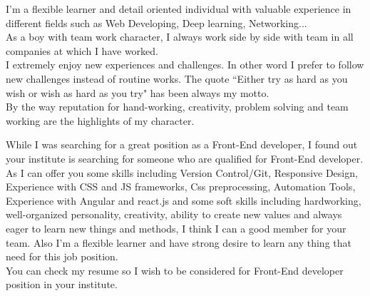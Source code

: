 \documentclass[11pt, a4paper]{awesome-cv}
\begin{document}
\makecvheader

\makelettertitle

\begin{cvletter}
I'm a flexible learner and detail oriented individual with valuable experience in different fields such as Web Developing, Deep learning, Networking...\\
As a boy with team work character, I always work side by side with team in all companies at which I have worked.\\
I extremely enjoy new experiences and challenges. In other word I prefer to follow new challenges instead of routine works. The quote ``Either try as hard as you wish or wish as hard as you try" has been always my motto.\\
By the way reputation for hand-working, creativity, problem solving and team working are the highlights of my character.

While I was searching for a great position as a Front-End developer, I found out your institute is searching for someone who are qualified for Front-End developer.\\
As I can offer you some skills including Version Control/Git, Responsive Design, Experience with CSS and JS frameworks, Css preprocessing, Automation Tools, Experience with Angular and react.js and some soft skills including hardworking, well-organized personality, creativity, ability to create new values and always eager to learn new things and methods, I think I can a good member for your team. Also I'm a flexible learner and have strong desire to learn any thing that need for this job position.\\
You can check my resume so I wish to be considered for  Front-End developer position in your institute.
\end{cvletter}

\makeletterclosing
\end{document}
